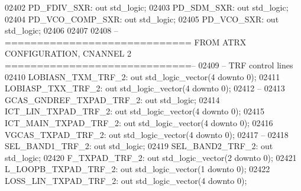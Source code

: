 \begin{DoxyCode}
02402     PD\_FDIV\_SXR:    \textcolor{keywordflow}{out} \textcolor{comment}{std\_logic};
02403     PD\_SDM\_SXR: \textcolor{keywordflow}{out} \textcolor{comment}{std\_logic};
02404     PD\_VCO\_COMP\_SXR:    \textcolor{keywordflow}{out} \textcolor{comment}{std\_logic};
02405     PD\_VCO\_SXR: \textcolor{keywordflow}{out} \textcolor{comment}{std\_logic};
02406 
02407 
02408 \textcolor{keyword}{    --============================= FROM ATRX CONFIGURATION, CNANNEL 2 =============================--}
02409 \textcolor{keyword}{    -- TRF control lines}
02410     LOBIASN\_TXM\_TRF\_2:  \textcolor{keywordflow}{out} \textcolor{comment}{std\_logic\_vector}(\textcolor{vhdllogic}{}\textcolor{vhdllogic}{4} \textcolor{keywordflow}{downto} \textcolor{vhdllogic}{}\textcolor{vhdllogic}{0});
02411     LOBIASP\_TXX\_TRF\_2:  \textcolor{keywordflow}{out} \textcolor{comment}{std\_logic\_vector}(\textcolor{vhdllogic}{}\textcolor{vhdllogic}{4} \textcolor{keywordflow}{downto} \textcolor{vhdllogic}{}\textcolor{vhdllogic}{0});
02412 \textcolor{keyword}{    --}
02413     GCAS\_GNDREF\_TXPAD\_TRF\_2:    \textcolor{keywordflow}{out} \textcolor{comment}{std\_logic};
02414     ICT\_LIN\_TXPAD\_TRF\_2:    \textcolor{keywordflow}{out} \textcolor{comment}{std\_logic\_vector}(\textcolor{vhdllogic}{}\textcolor{vhdllogic}{4} \textcolor{keywordflow}{downto} \textcolor{vhdllogic}{}\textcolor{vhdllogic}{0});
02415     ICT\_MAIN\_TXPAD\_TRF\_2:   \textcolor{keywordflow}{out} \textcolor{comment}{std\_logic\_vector}(\textcolor{vhdllogic}{}\textcolor{vhdllogic}{4} \textcolor{keywordflow}{downto} \textcolor{vhdllogic}{}\textcolor{vhdllogic}{0});
02416     VGCAS\_TXPAD\_TRF\_2:  \textcolor{keywordflow}{out} \textcolor{comment}{std\_logic\_vector}(\textcolor{vhdllogic}{}\textcolor{vhdllogic}{4} \textcolor{keywordflow}{downto} \textcolor{vhdllogic}{}\textcolor{vhdllogic}{0});
02417 \textcolor{keyword}{    --}
02418     SEL\_BAND1\_TRF\_2:    \textcolor{keywordflow}{out} \textcolor{comment}{std\_logic};
02419     SEL\_BAND2\_TRF\_2:    \textcolor{keywordflow}{out} \textcolor{comment}{std\_logic};
02420     F\_TXPAD\_TRF\_2:  \textcolor{keywordflow}{out} \textcolor{comment}{std\_logic\_vector}(\textcolor{vhdllogic}{}\textcolor{vhdllogic}{2} \textcolor{keywordflow}{downto} \textcolor{vhdllogic}{}\textcolor{vhdllogic}{0});
02421     L\_LOOPB\_TXPAD\_TRF\_2:    \textcolor{keywordflow}{out} \textcolor{comment}{std\_logic\_vector}(\textcolor{vhdllogic}{}\textcolor{vhdllogic}{1} \textcolor{keywordflow}{downto} \textcolor{vhdllogic}{}\textcolor{vhdllogic}{0});
02422     LOSS\_LIN\_TXPAD\_TRF\_2:   \textcolor{keywordflow}{out} \textcolor{comment}{std\_logic\_vector}(\textcolor{vhdllogic}{}\textcolor{vhdllogic}{4} \textcolor{keywordflow}{downto} \textcolor{vhdllogic}{}\textcolor{vhdllogic}{0});

\end{DoxyCode}
